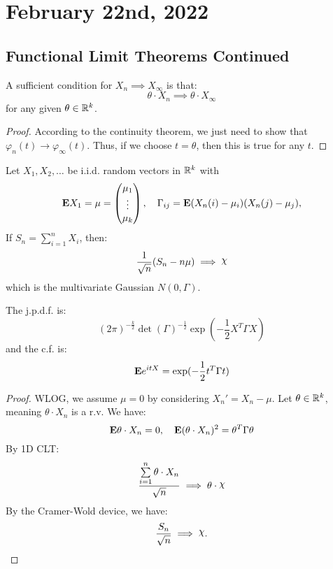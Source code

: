 \documentclass[../main/main.tex]{subfiles}
\begin{document}
\section{February 22nd, 2022}
\subsection{Functional Limit Theorems Continued}
\begin{theorem}
	A sufficient condition for $X_n \implies X_{\infty}$ is that: \[
		\theta \cdot X_n \implies \theta \cdot X_{\infty}
	\] for any given $\theta \in \mathbb{R}^{k}$.
\end{theorem}
\begin{proof}
	According to the continuity theorem, we just need to show that $\varphi_n(t) \to \varphi_{\infty}(t)$. Thus, if we choose $t = \theta$, then this is true for any $t$.
\end{proof}

\begin{theorem}
	Let $X_1, X_2, \ldots $ be i.i.d. random vectors in $\mathbb{R}^{k}$ with \[
		\text{\textbf{E}} X_1 = \mu = \begin{pmatrix}
			\mu_1 \\ \vdots \\ \mu_k
		\end{pmatrix}, \quad \Gamma_{ij} = \text{\textbf{E}} (X_n(i) - \mu_i) (X_n(j) - \mu_j),
	\]  If $S_n = \sum\limits_{i=1}^{n} X_i$, then: \[
		\frac{1}{\sqrt{n}}(S_n - n \mu )\implies \chii
	\] which is the multivariate Gaussian $N(0,\Gamma)$.
\end{theorem}

\begin{definition} The j.p.d.f. is: \[
		(2 \pi)^{-\frac{k}{2}} \operatorname{det}(\Gamma)^{-\frac{1}{2}} \exp(-\frac{1}{2} X^{T}\Gamma X)
	\]
	and the c.f. is: \[
		\text{\textbf{E}} e^{it X} = \exp(-\frac{1}{2}t^{T}\Gamma t)
	\]
\end{definition}

\begin{proof}
	WLOG, we assume $\mu = 0$ by considering $X_n' = X_n - \mu$. Let $\theta \in \mathbb{R}^{k}$, meaning $\theta \cdot X_n$ is a r.v. We have: \[
		\text{\textbf{E}} \theta \cdot X_n = 0, \quad \text{\textbf{E}} (\theta \cdot X_{n})^2 = \theta^{T} \Gamma \theta
	\] By 1D CLT: \[
		\frac{\sum\limits_{i=1}^{n}\theta \cdot X_n}{\sqrt{n}} \implies \theta \cdot \chii
	\]
	By the Cramer-Wold device, we have: \[
		\frac{S_n}{\sqrt{n}} \implies \chii.
	\]
\end{proof}
\end{document}
